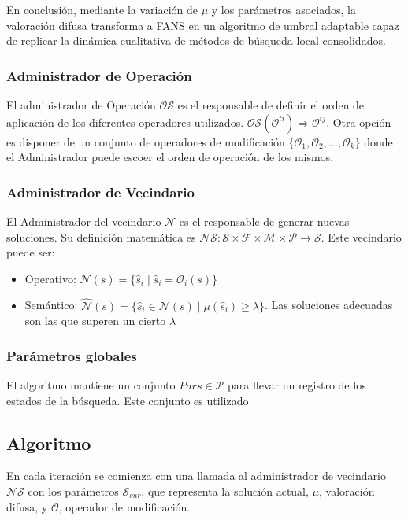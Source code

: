En conclusión, mediante la variación de $\mu$ y los parámetros asociados, la valoración difusa transforma a FANS en un algoritmo de umbral adaptable capaz de replicar la dinámica cualitativa de métodos de búsqueda local consolidados.

\subsubsection{Administrador de Operación}

El administrador de Operación $\mathcal{OS}$ es el responsable de definir el orden de aplicación de los diferentes operadores utilizados.
$\mathcal{OS}(\mathcal{O}^{ti}) \Rightarrow \mathcal{O}^{tj}$. Otra opción es disponer de un conjunto de operadores de modificación $\{\mathcal{O}_1, \mathcal{O}_2,\ldots,\mathcal{O}_k\}$ donde el Administrador puede escoer el orden de operación de los mismos.

\subsubsection{Administrador de Vecindario}
El Administrador del vecindario $\mathcal{N}$ es el responsable de generar nuevas soluciones. Su definición matemática es 
$\mathcal{NS}:\mathcal{S}\times\mathcal{F}\times\mathcal{M}\times\mathcal{P}\rightarrow\mathcal{S}$. Este vecindario puede ser:
\begin{itemize}
    \item Operativo: $\mathcal{N}(s) = \{ \hat{s}_i \mid \hat{s}_i = \mathcal{O}_i(s) \}$
    \item Semántico: $\hat{\mathcal{N}}(s) = \{ \hat{s}_i \in \mathcal{N}(s) \mid \mu(\hat{s}_i) \geq \lambda \}$. Las soluciones adecuadas son las que superen un cierto $\lambda$
\end{itemize}

\subsubsection{Parámetros globales}

El algoritmo mantiene un conjunto $Pars \in \mathcal{P}$ para llevar un registro de los estados de la búsqueda. Este conjunto es utilizado

\subsection{Algoritmo}

En cada iteración se comienza con una llamada al administrador de vecindario $\mathcal{NS}$ con los parámetros $\mathcal{S}_{cur}$, que representa la solución actual, $\mu$, valoración difusa, y $\mathcal{O}$, operador de modificación.

